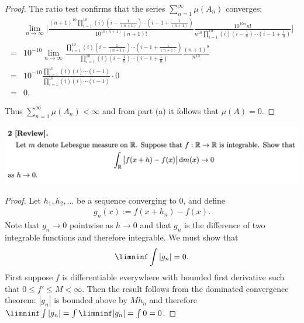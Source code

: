 \begin{enumerate}[label=(\alph*)]
\begin{proof}
  The ratio test confirms that the series $\sum_{n=1}^\infty \mu(A_n)$ converges:
  \begin{align*}
    &\lim_{n\to\infty} \Bigg|\frac{(n+1)^{10}\prod_{i=1}^{10} (i)(i -\frac{1}{(n+1)} )\cdots(i - 1 +\frac{1}{(n+1)} )}{10^{10(n+1)}(n+1)!}     \frac{10^{10n}n!}{n^{10}\prod_{i=1}^{10} (i)(i -\frac{1}{n} )\cdots(i - 1 +\frac{1}{n} )}\Bigg| \\
    = &10^{-10}\lim_{n\to\infty} \frac{\prod_{i=1}^{10} (i)(i -\frac{1}{(n+1)} )\cdots(i - 1 +\frac{1}{(n+1)} )}{\prod_{i=1}^{10} (i)(i -\frac{1}{n} )\cdots(i - 1 +\frac{1}{n} )}     \frac{(n+1)^{9}}{n^{10}} \\
    = &10^{-10}\frac{\prod_{i=1}^{10} (i)(i )\cdots(i - 1  )}{\prod_{i=1}^{10} (i)(i )\cdots(i - 1 )}   \cdot  0 \\
    = &0.
  \end{align*}

  Thus $\sum_{n=1}^\infty \mu(A_n) < \infty$ and from part (a) it follows that $\mu(A) = 0$.
\end{proof}
\end{enumerate}

\newpage
\begin{mdframed}
\includegraphics[width=400pt]{img/analysis--berkeley-202a-hw10-5e9e.png}
\end{mdframed}

\begin{proof}
  Let $h_1, h_2, ...$ be a sequence converging to $0$, and define
  \begin{align*}
    g_n(x) := f(x + h_n) - f(x).
  \end{align*}
  Note that $g_n \to 0$ pointwise as $h \to 0$ and that $g_n$ is the difference of two integrable functions and
  therefore integrable. We must show that
  \begin{align*}
    \limninf \int |g_n| = 0.
  \end{align*}
  First suppose $f$ is differentiable everywhere with bounded first derivative such
  that $0 \leq f' \leq M < \infty$. Then the result follows from the dominated convergence theorem: $|g_n|$ is
  bounded above by $Mh_n$ and therefore $\limninf \int |g_n| = \int \limninf |g_n| = \int 0 = 0$.


\end{proof}



